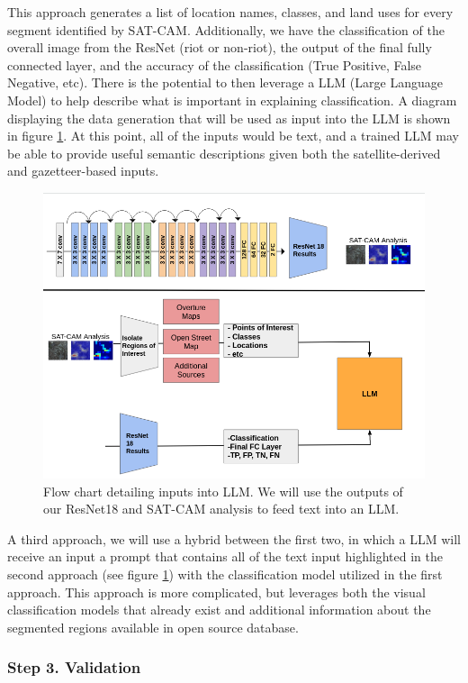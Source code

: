 This approach generates a list of location names, classes, and land uses for every segment identified by SAT-CAM.  Additionally, we have the classification of the overall image from the ResNet (riot or non-riot), the output of the final fully connected layer, and the accuracy of the classification (True Positive, False Negative, etc).  There is the potential to then leverage a LLM (Large Language Model) to help describe what is important in explaining classification.  A diagram displaying the data generation that will be used as input into the LLM is shown in figure \ref{fig:paper2_flowchart}.  At this point, all of the inputs would be text, and a trained LLM may be able to provide useful semantic descriptions given both the satellite-derived and gazetteer-based inputs.


\begin{figure}
    \centering
    \includegraphics[width=0.75\linewidth]{Figures/paper2_data_flowchart.png}
    \caption{Flow chart detailing inputs into LLM.  We will use the outputs of our ResNet18 and SAT-CAM analysis to feed text into an LLM. }
    \label{fig:paper2_flowchart}
\end{figure}


A third approach, we will use a hybrid between the first two, in which a LLM will receive an input a prompt that contains all of the text input highlighted in the second approach (see figure \ref{fig:paper2_flowchart}) with the classification model utilized in the first approach.  This approach is more complicated, but leverages both the visual classification models that already exist and additional information about the segmented regions available in open source database.  

\subsubsection{Step 3. Validation}

